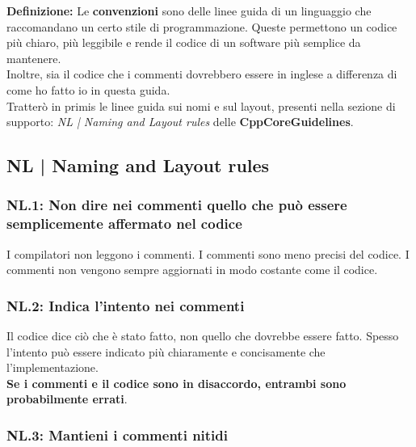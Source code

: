 \textsf{\small \textbf{Definizione: } Le \textbf{convenzioni} sono delle linee guida di un linguaggio che raccomandano un certo stile di programmazione. Queste permettono un codice più chiaro, più leggibile e rende il codice di un software più semplice da mantenere.} \\

\textsf{\small Inoltre, sia il codice che i commenti dovrebbero essere in inglese a differenza di come ho fatto io in questa guida.} \\

\textsf{\small Tratterò in primis le linee guida sui nomi e sul layout, presenti nella sezione di supporto: \emph{NL | Naming and Layout rules} delle \textbf{CppCoreGuidelines}.} \break


\subsection{NL | Naming and Layout rules}

\subsubsection{NL.1: Non dire nei commenti quello che può essere semplicemente affermato nel codice}

\textsf{\small I compilatori non leggono i commenti. I commenti sono meno precisi del codice. I commenti non vengono sempre aggiornati in modo costante come il codice.} \\

\subsubsection{NL.2: Indica l'intento nei commenti}

\textsf{\small Il codice dice ciò che è stato fatto, non quello che dovrebbe essere fatto. Spesso l'intento può essere indicato più chiaramente e concisamente che l'implementazione. } \\

\textsf{\small \textbf{Se i commenti e il codice sono in disaccordo, entrambi sono probabilmente errati}.} \\

\subsubsection{NL.3: Mantieni i commenti nitidi}

